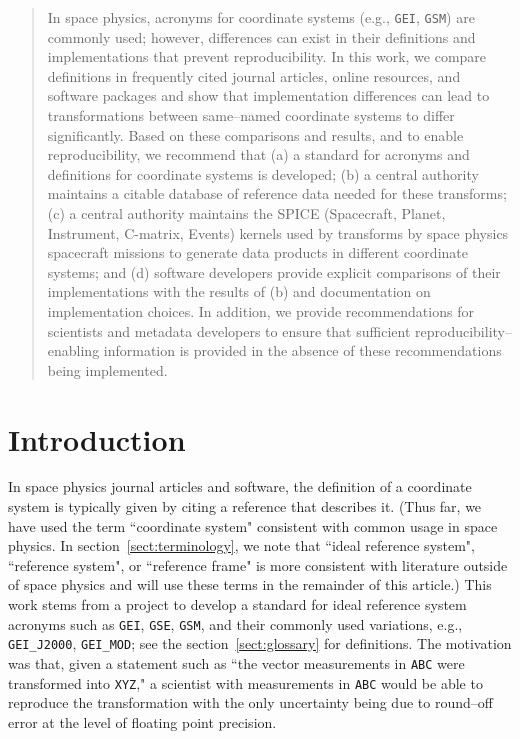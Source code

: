 \documentclass[draft]{agujournal2019}
\begin{document}
\begin{abstract}
In space physics, acronyms for coordinate systems (e.g., \texttt{GEI}, \texttt{GSM}) are commonly used; however, differences can exist in their definitions and implementations that prevent reproducibility. In this work, we compare definitions in frequently cited journal articles, online resources, and software packages and show that implementation differences can lead to transformations between same--named coordinate systems to differ significantly. Based on these comparisons and results, and to enable reproducibility, we recommend that (a) a standard for acronyms and definitions for coordinate systems is developed; (b) a central authority maintains a citable database of reference data needed for these transforms;  (c) a central authority maintains the SPICE (Spacecraft, Planet, Instrument, C-matrix, Events) kernels used by transforms by space physics spacecraft missions to generate data products in different coordinate systems; and (d) software developers provide explicit comparisons of their implementations with the results of (b) and documentation on implementation choices. In addition, we provide recommendations for scientists and metadata developers to ensure that sufficient reproducibility--enabling information is provided in the absence of these recommendations being implemented.
\end{abstract}

\section{Introduction}

In space physics journal articles and software, the definition of a coordinate system is typically given by citing a reference that describes it. (Thus far, we have used the term ``coordinate system" consistent with common usage in space physics. In section~\ref{sect:terminology}, we note that ``ideal reference system", ``reference system", or ``reference frame" is more consistent with literature outside of space physics and will use these terms in the remainder of this article.)
This work stems from a project to develop a standard for ideal reference system acronyms such as \texttt{GEI}, \texttt{GSE}, \texttt{GSM}, and their commonly used variations, e.g., \texttt{GEI\_J2000}, \texttt{GEI\_MOD}; see the section~\ref{sect:glossary} for definitions. The motivation was that, given a statement such as ``the vector measurements in \texttt{ABC} were transformed into \texttt{XYZ}," a scientist with measurements in \texttt{ABC} would be able to reproduce the transformation with the only uncertainty being due to round--off error at the level of floating point precision.
\end{document}
